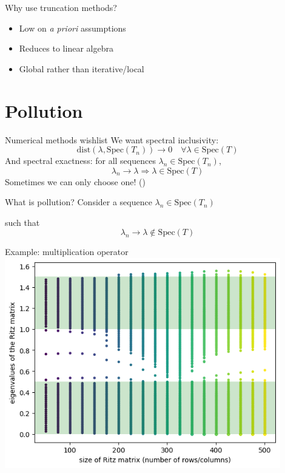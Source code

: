 \documentclass[14pt]{beamer}
\newcommand{\Spec}{\mathrm{Spec}} %
\newcommand{\dist}{\mathrm{dist}} %
\newcommand{\1}{\mathbf{1}}
\begin{document}
\begin{frame}{Why use truncation methods?}
  \begin{itemize}
    \item Low on \emph{a priori} assumptions
    \item Reduces to linear algebra
    \item Global rather than iterative/local
  \end{itemize}
\end{frame}

\section{Pollution}
\begin{frame}{Numerical methods wishlist}
  We want spectral inclusivity:
  $$\dist(\lambda, \Spec(T_n)) \rightarrow 0 \quad \forall \lambda \in \Spec(T)$$
  And spectral exactness: for all sequences $\lambda_n \in \Spec(T_n)$,
  $$\lambda_n \rightarrow \lambda \Rightarrow \lambda \in \Spec(T)$$
  Sometimes we can only choose one! (\textcite{colbrook2019how})
\end{frame}

\begin{frame}{What is pollution?}
  \centering
  Consider a sequence $\lambda_n \in \Spec(T_n)$

  such that
  $$\lambda_n \rightarrow \lambda \notin \Spec(T)$$
\end{frame}

\begin{frame}{Example: multiplication operator}
  \includegraphics[width=0.9\textwidth]{mult-op-spec}
\end{frame}
\end{document}
